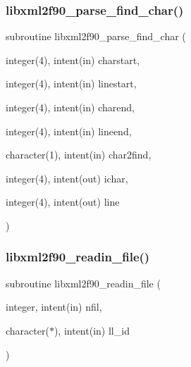\subsubsection{\texorpdfstring{libxml2f90\+\_\+parse\+\_\+find\+\_\+char()}{libxml2f90\_parse\_find\_char()}}
{\footnotesize\ttfamily subroutine libxml2f90\+\_\+parse\+\_\+find\+\_\+char (\begin{DoxyParamCaption}\item[{integer(4), intent(in)}]{charstart,  }\item[{integer(4), intent(in)}]{linestart,  }\item[{integer(4), intent(in)}]{charend,  }\item[{integer(4), intent(in)}]{lineend,  }\item[{character(1), intent(in)}]{char2find,  }\item[{integer(4), intent(out)}]{ichar,  }\item[{integer(4), intent(out)}]{line }\end{DoxyParamCaption})}

\mbox{\label{libxml2f90_8f90__pp_8f90_ae414619cb8c245cec37ab69b1acd4482}} 
\subsubsection{\texorpdfstring{libxml2f90\+\_\+readin\+\_\+file()}{libxml2f90\_readin\_file()}}
{\footnotesize\ttfamily subroutine libxml2f90\+\_\+readin\+\_\+file (\begin{DoxyParamCaption}\item[{integer, intent(in)}]{nfil,  }\item[{character($\ast$), intent(in)}]{ll\+\_\+id }\end{DoxyParamCaption})}


